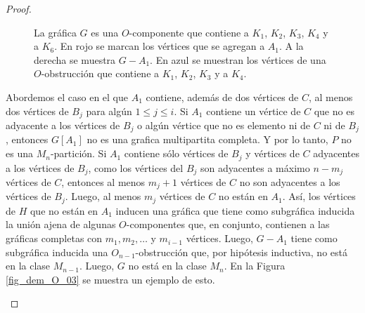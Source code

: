\begin{proof}
\begin{figure}[ht!]
\caption{La gráfica $G$ es una $O$-componente que contiene a $K_1$, $K_2$, $K_3$, $K_4$ y a $K_6$. En rojo se marcan los vértices que se agregan a $A_1$. A la derecha se muestra $G-A_1$. En azul se muestran los vértices de una $O$-obstrucción que contiene a $K_1$, $K_2$, $K_3$ y a $K_4$.}
\label{fig_dem_O_02}
\end{figure}

Abordemos el caso en el que $A_1$ contiene, además de dos vértices de $C$, al menos dos vértices de $B_j$ para algún $1\le j \le i$. Si $A_1$ contiene un vértice de $C$ que no es adyacente a los vértices de $B_j$ o algún vértice que no es elemento ni de $C$ ni de $B_j$, entonces $G[A_1]$ no es una grafica multipartita completa. Y por lo tanto, $P$ no es una $M_n$-partición. Si $A_1$ contiene sólo vértices de $B_j$ y vértices de $C$ adyacentes a los vértices de $B_j$, como los vértices del $B_j$ son adyacentes a máximo $n-m_j$ vértices de $C$, entonces al menos $m_j+1$ vértices de $C$ no son adyacentes a los vértices de $B_j$. Luego, al menos $m_j$ vértices de $C$ no están en $A_1$. Así, los vértices de $H$ que no están en $A_1$ inducen una gráfica que tiene como subgráfica inducida la unión ajena de algunas $O$-componentes que, en conjunto, contienen a las gráficas completas con $m_1, m_2,\dots$ y $m_{i-1}$ vértices. Luego, $G-A_1$ tiene como subgráfica inducida una $O_{n-1}$-obstrucción que, por hipótesis inductiva, no está en la clase $M_{n-1}$. Luego, $G$ no está en la clase $M_n$. En la Figura \ref{fig_dem_O_03} se muestra un ejemplo de esto.

\begin{figure}[ht!]

\begin{subfigure}{\textwidth}
\begin{center}
\end{center}
\end{subfigure}
\end{figure}
\end{proof}
